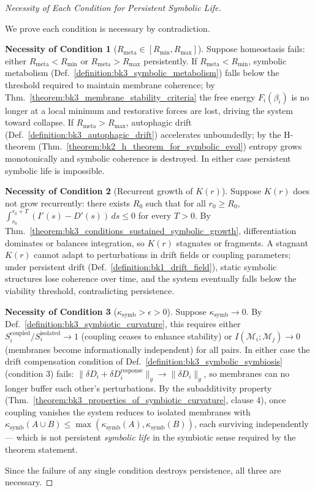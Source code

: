\begin{proof}[Necessity of Each Condition for Persistent Symbolic Life]
\label{proof:bk3_sketch_necessity_for_continuous_operation}
\leavevmode

We prove each condition is necessary by contradiction.

\textbf{Necessity of Condition 1} ($R_{\text{meta}} \in [R_{\text{min}}, R_{\text{max}}]$).
Suppose homeostasis fails: either $R_{\text{meta}} < R_{\text{min}}$ or
$R_{\text{meta}} > R_{\text{max}}$ persistently.
If $R_{\text{meta}} < R_{\text{min}}$, symbolic metabolism
(Def.~\ref{definition:bk3_symbolic_metabolism}) falls below the threshold
required to maintain membrane coherence; by
Thm.~\ref{theorem:bk3_membrane_stability_criteria} the free energy $F_i(\beta_i)$
is no longer at a local minimum and restorative forces are lost, driving the
system toward collapse.
If $R_{\text{meta}} > R_{\text{max}}$, autophagic drift
(Def.~\ref{definition:bk3_autophagic_drift}) accelerates unboundedly; by the
H-theorem (Thm.~\ref{theorem:bk2_h_theorem_for_symbolic_evol}) entropy grows
monotonically and symbolic coherence is destroyed.
In either case persistent symbolic life is impossible.

\textbf{Necessity of Condition 2} (Recurrent growth of $K(r)$).
Suppose $K(r)$ does not grow recurrently: there exists $R_0$ such that for all
$r_0 \geq R_0$, $\int_{r_0}^{r_0+T}(I'(s)-D'(s))\,ds \leq 0$ for every $T>0$.
By Thm.~\ref{theorem:bk3_conditions_sustained_symbolic_growth}, differentiation
dominates or balances integration, so $K(r)$ stagnates or fragments.
A stagnant $K(r)$ cannot adapt to perturbations in drift fields or coupling
parameters; under persistent drift (Def.~\ref{definition:bk1_drift_field}),
static symbolic structures lose coherence over time, and the system eventually
falls below the viability threshold, contradicting persistence.

\textbf{Necessity of Condition 3} ($\kappa_{\text{symb}} > \epsilon > 0$).
Suppose $\kappa_{\text{symb}} \to 0$.
By Def.~\ref{definition:bk3_symbiotic_curvature}, this requires either
$S_i^{\text{coupled}}/S_i^{\text{isolated}} \to 1$ (coupling ceases to enhance
stability) or $I(\mathcal{M}_i;\mathcal{M}_j) \to 0$ (membranes become
informationally independent) for all pairs.
In either case the drift compensation condition of
Def.~\ref{definition:bk3_symbolic_symbiosis} (condition 3) fails:
$\|\delta D_i + \delta D_i^{\text{response}}\|_g \to \|\delta D_i\|_g$,
so membranes can no longer buffer each other's perturbations.
By the subadditivity property (Thm.~\ref{theorem:bk3_properties_of_symbiotic_curvature},
clause 4), once coupling vanishes the system reduces to isolated membranes with
$\kappa_{\text{symb}}(A \cup B) \leq \max(\kappa_{\text{symb}}(A),\kappa_{\text{symb}}(B))$,
each surviving independently — which is not persistent \emph{symbolic life} in the
symbiotic sense required by the theorem statement.

Since the failure of any single condition destroys persistence, all three are necessary.
\end{proof}

